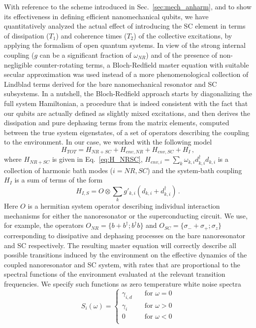 \documentclass[aps,twocolumn,groupedaddress,superscriptaddress,floatfix,amsmath,amssymb,prb]{revtex4-1}
\begin{document}
With reference to the scheme introduced in Sec.~\ref{sec:mech_anharm}, and to show its effectiveness in defining efficient nanomechanical qubits, we have quantitatively analyzed the actual effect of introducing  the SC element in terms of dissipation ($T_1$) and coherence times ($T_2$) of the collective excitations, by applying the formalism of open quantum systems. In view of the strong internal coupling ($g$ can be a significant fraction of $\omega_{NR}$) and of the presence of non-negligible counter-rotating terms, a Bloch-Redfield master equation with suitable secular approximation \cite{Breuer2002} was used instead of a more phenomenological collection of Lindblad terms derived for the bare nanomechanical resonator and SC subsystems. In a nutshell, the Bloch-Redfield approach starts by diagonalizing the full system Hamiltonian, a procedure that is indeed consistent with the fact that our qubits are actually defined as slightly mixed excitations, and then derives the dissipation and pure dephasing terms from the matrix elements, computed between the true system eigenstates, of a set of operators describing the coupling to the environment. In our case, we worked with the following model
\begin{equation}
H_{TOT} = H_{NR+SC} + H_{env,NR} + H_{env,SC} + H_{I} \, ,
\end{equation}
where $H_{NR+SC}$ is given in Eq.\ \eqref{eq:H_NRSC}, $H_{env,i} = \sum_k \omega_{k,i} d^\dagger_{k,i} d_{k,i}$ is a collection of harmonic bath modes ($i = NR, SC$) and the system-bath coupling $H_I$ is a sum of terms of the form
\begin{equation}
H_{I,S} = O \otimes \sum_k g'_{k,i} (d_{k,i} + d_{k,i}^\dagger) \, .
\end{equation}
Here $O$ is a hermitian system operator describing individual interaction mechanisms for either the nanoresonator or the superconducting circuit. We use, for example, the operators $O_{NR} = \{b+b^\dagger;b^\dagger b\}$ and $O_{SC} = \{ \sigma_- +\sigma_+;\sigma_z\}$ corresponding to dissipative and dephasing processes on the bare nanoresonator and SC respectively. The resulting master equation will correctly describe all possible transitions induced by the environment on the effective dynamics of the coupled nanoresonator and SC system, with rates that are proportional to the spectral functions of the environment evaluated at the relevant transition frequencies. We specify such functions as zero temperature white noise spectra
\begin{equation}
S_i (\omega) = \begin{cases} \gamma_{i,d} \quad & \text{for } \omega = 0 \\
\gamma_{i} \quad & \text{for }\omega > 0 \\
0 \quad & \text{for }\omega < 0 \\
 \end{cases}
\end{equation}
\end{document}
